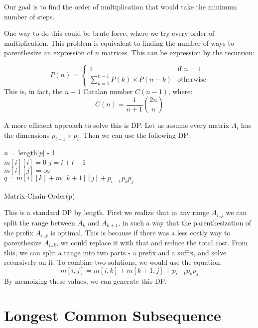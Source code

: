 \documentclass[12pt,letterpaper]{article}
\theoremstyle{definition}
\begin{document}
Our goal is to find the order of multiplication that would take the minimum number of steps.

One way to do this could be brute force, where we try every order of multiplication. This problem is equivalent to finding the number of ways to parenthesize an expression of $n$ matrices. This can be expression by the recursion:

\[P(n) = \begin{cases}
1 & \text{if } n = 1 \\
\sum_{k=1}^{n-1} P(k) \times P(n-k) & \text{otherwise}
\end{cases}
\]
This is, in fact, the $n-1$ Catalan number $C(n-1)$, where:
\[C(n) = \frac{1}{n+1} {2n \choose n}\]

A more efficient approach to solve this is DP. Let us assume every matrix $A_i$ has the dimensions $p_{i-1} \times p_i$. Then we can use the following DP:

\begin{algorithm}[H]
  \SetAlgoLined
  $n$ = length[$p$] - 1 \\
   {
    $m[i][i] = 0$
  }
   {
     {
      $j=i+l-1$ \\
      $m[i][j] = \infty$ \\
       {
        $q = m[i][k] + m[k+1][j] + p_{i-1}p_kp_j$ \\
      }
    }
  }
  \caption{Matrix-Chain-Order(p)}
\end{algorithm}

This is a standard DP by length. First we realize that in any range $A_{i..j}$ we can split the range between $A_k$ and $A_{k+1}$, in such a way that the parenthesization of the prefix $A_{i..k}$ is optimal. This is because if there was a less costly way to parenthesize $A_{i..k}$, we could replace it with that and reduce the total cost. From this, we can split a range into two parts - a prefix and a suffix, and solve recursively on it. To combine two solutions, we would use the equation:
\[m[i,j] = m[i,k] + m[k+1,j] + p_{i-1} p_k p_j\]
By memoizing these values, we can generate this DP.

\section{Longest Common Subsequence}
\end{document}
